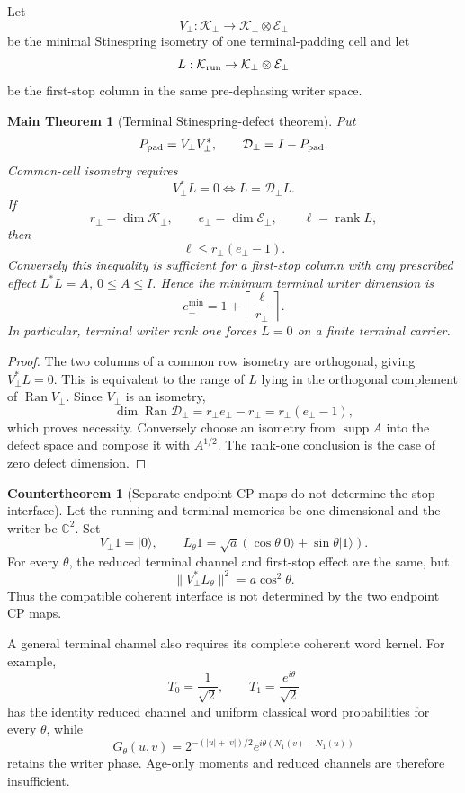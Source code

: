 \documentclass[11pt,oneside,openany]{book}
\numberwithin{equation}{chapter}
\newtheorem{maintheorem}[theorem]{Main Theorem}
\theoremstyle{definition}
\newtheorem{countertheorem}[theorem]{Countertheorem}
\theoremstyle{remark}
\newcommand{\C}{\mathbb C}
\newcommand{\rank}{\operatorname{rank}}
\newcommand{\supp}{\operatorname{supp}}
\newcommand{\Ran}{\operatorname{Ran}}
\newcommand{\norm}[1]{\lVert #1\rVert}
\begin{document}
Let
\[
 V_\bot:\mathcal K_\bot\to
 \mathcal K_\bot\otimes\mathcal E_\bot
\]
be the minimal Stinespring isometry of one terminal-padding cell and let
\[
 L:\mathcal K_{\rm run}\to
 \mathcal K_\bot\otimes\mathcal E_\bot
\]
be the first-stop column in the same pre-dephasing writer space.

\begin{maintheorem}[Terminal Stinespring-defect theorem]
\label{thm:v6-terminal-defect}
Put
\[
 P_{\rm pad}=V_\bot V_\bot^*,
 \qquad
 \mathcal D_\bot=I-P_{\rm pad}.
\]
Common-cell isometry requires
\[
 \boxed{V_\bot^*L=0
 \iff L=\mathcal D_\bot L.}
\]
If
\[
 r_\bot=\dim\mathcal K_\bot,
 \qquad e_\bot=\dim\mathcal E_\bot,
 \qquad \ell=\rank L,
\]
then
\[
 \boxed{\ell\le r_\bot(e_\bot-1).}
\]
Conversely this inequality is sufficient for a first-stop column with any
prescribed effect \(L^*L=A\), \(0\le A\le I\).  Hence the minimum terminal
writer dimension is
\[
 \boxed{e_\bot^{\min}=1+\left\lceil\frac{\ell}{r_\bot}\right\rceil.}
\]
In particular, terminal writer rank one forces \(L=0\) on a finite terminal
carrier.
\end{maintheorem}

\begin{proof}
The two columns of a common row isometry are orthogonal, giving
\(V_\bot^*L=0\).  This is equivalent to the range of \(L\) lying in the
orthogonal complement of \(\Ran V_\bot\).  Since \(V_\bot\) is an isometry,
\[
 \dim\Ran\mathcal D_\bot
 =r_\bot e_\bot-r_\bot=r_\bot(e_\bot-1),
\]
which proves necessity.  Conversely choose an isometry from \(\supp A\) into
the defect space and compose it with \(A^{1/2}\).  The rank-one conclusion is
the case of zero defect dimension.
\end{proof}

\begin{countertheorem}[Separate endpoint CP maps do not determine the stop interface]
\label{cth:v6-stop-interface}
Let the running and terminal memories be one dimensional and the writer be
\(\C^2\).  Set
\[
 V_\bot1=|0\rangle,
 \qquad
 L_\theta1=\sqrt a
 (\cos\theta|0\rangle+\sin\theta|1\rangle).
\]
For every \(\theta\), the reduced terminal channel and first-stop effect are
the same, but
\[
 \boxed{\norm{V_\bot^*L_\theta}^2=a\cos^2\theta.}
\]
Thus the compatible coherent interface is not determined by the two endpoint
CP maps.
\end{countertheorem}

A general terminal channel also requires its complete coherent word kernel.
For example,
\[
 T_0=\frac{1}{\sqrt2},
 \qquad T_1=\frac{e^{i\theta}}{\sqrt2}
\]
has the identity reduced channel and uniform classical word probabilities for
every \(\theta\), while
\[
 G_\theta(u,v)
 =2^{-(|u|+|v|)/2}
 e^{i\theta(N_1(v)-N_1(u))}
\]
retains the writer phase.  Age-only moments and reduced channels are therefore
insufficient.
\end{document}
